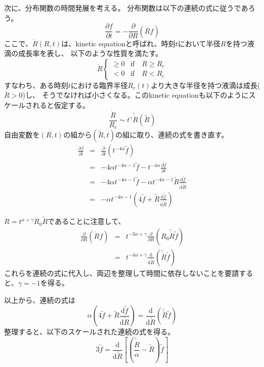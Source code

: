 \documentclass{jarticle}
\newcommand{\diff}{{\mathrm d}}
\begin{document}
次に、分布関数の時間発展を考える。
分布関数は以下の連続の式に従うであろう。
\begin{equation}
    \frac{\partial f}{\partial t} = - \frac{\partial }{\partial R} \left(\dot{R} f \right)
\end{equation}
ここで、$\dot{R}(R,t)$は、kinetic equationと呼ばれ、時刻$t$において半径$R$を持つ液滴の成長率を表し、
以下のような性質を満たす。
\begin{equation}
    \dot{R}
    \left\{
    \begin{array}{cc}
        \geq  0 & \textrm{if} \quad  R \ge R_c \\
        <  0    & \textrm{if} \quad R < R_c
    \end{array}
    \right.
\end{equation}
すなわち、ある時刻$t$における臨界半径$R_c(t)$より大きな半径を持つ液滴は成長($\dot{R}>0$)し、
そうでなければ小さくなる。このkinetic equationも以下のようにスケールされると仮定する。
\begin{equation}
    \frac{\dot{R}}{R_c} \sim t^\gamma \tilde{\dot{R}}(\tilde{R})
\end{equation}
自由変数を$(R,t)$の組から$(\tilde{R},t)$の組に取り、連続の式を書き直す。
\begin{eqnarray}
    \frac{\partial f}{\partial t}  &=& \frac{\partial }{\partial t}  (t^{-4\alpha} \tilde{f}) \\
    &=& - 4 \alpha t^{-4\alpha -1} \tilde{f} - t^{-4\alpha}\frac{\partial \tilde{f}}{\partial t} \\
    &=& - 4 \alpha t^{-4\alpha -1} \tilde{f} - \alpha t^{-4\alpha-1} \tilde{R} \frac{\diff \tilde{f}}{\diff \tilde{R}} \\
    &=& - \alpha t^{-4 \alpha -1} \left( 4 \tilde{f}  + \tilde{R}\frac{\diff \tilde{f}}{\diff \tilde{R}} \right)
\end{eqnarray}

$\dot{R} = t^{\alpha + \gamma} R_0 \tilde{R}$であることに注意して、
\begin{eqnarray}
    \frac{\partial }{\partial R} \left(\dot{R} f \right) &=& t^{-3\alpha + \gamma} \frac{\partial }{\partial R} \left(R_0 \tilde{\dot{R}} \tilde{f} \right) \\
    &=& t^{-4 \alpha + \gamma} \frac{\diff }{\diff \tilde{R}} \left(\tilde{\dot{R}} \tilde{f} \right)
\end{eqnarray}
これらを連続の式に代入し、両辺を整理して時間に依存しないことを要請すると、$\gamma = -1$を得る。

以上から、連続の式は
\begin{equation}
    \alpha \left( 4 \tilde{f}  + \tilde{R}\frac{\diff \tilde{f}}{\diff \tilde{R}} \right)  = \frac{\diff }{\diff \tilde{R}} \left(\tilde{\dot{R}} \tilde{f} \right)
\end{equation}
整理すると、以下のスケールされた連続の式を得る。
\begin{equation}
    3 \tilde{f} = \frac{\diff }{\diff \tilde{R}} \left[ \left(   \frac{\tilde{\dot{R}}}{\alpha } - \tilde{R} \right) \tilde{f}  \right] \label{eq_r}
\end{equation}
\end{document}
